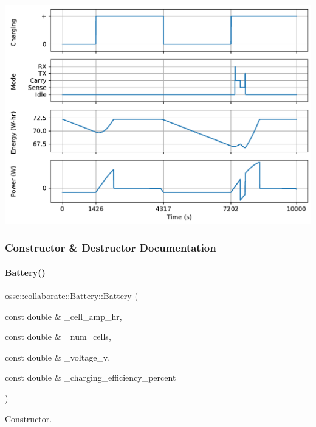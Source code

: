  
\begin{DoxyImageNoCaption}
  \mbox{\includegraphics[width=\textwidth]{power}}
\end{DoxyImageNoCaption}
 

\subsubsection{Constructor \& Destructor Documentation}
\mbox{\label{classosse_1_1collaborate_1_1_battery_aa7cf9b637b12ead425d0643e325e3b85}} 
\paragraph{\texorpdfstring{Battery()}{Battery()}}
{\footnotesize\ttfamily osse\+::collaborate\+::\+Battery\+::\+Battery (\begin{DoxyParamCaption}\item[{const double \&}]{\+\_\+cell\+\_\+amp\+\_\+hr,  }\item[{const double \&}]{\+\_\+num\+\_\+cells,  }\item[{const double \&}]{\+\_\+voltage\+\_\+v,  }\item[{const double \&}]{\+\_\+charging\+\_\+efficiency\+\_\+percent }\end{DoxyParamCaption})}



Constructor. 


